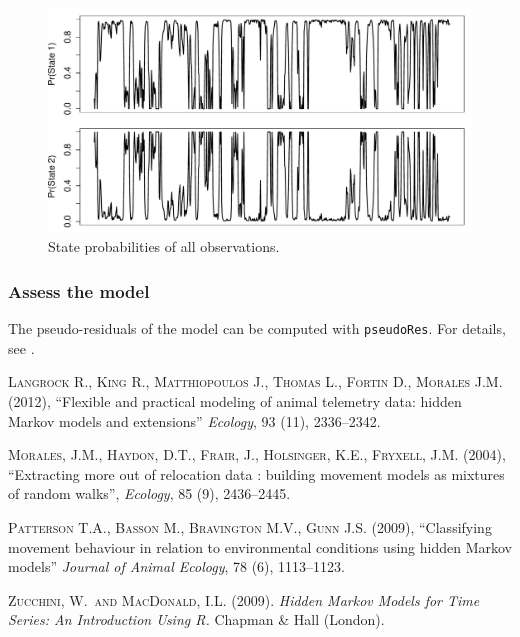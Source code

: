 \documentclass[]{article}
\begin{document}
\begin{figure}[h]
	\centering
	\includegraphics[width=\textwidth]{pictures/stateProbs}
	\caption{State probabilities of all observations.}
	\label{stateProbs}
\end{figure}

\subsubsection{Assess the model}
The pseudo-residuals of the model can be computed with \texttt{pseudoRes}. For details, see \cite{zucchini2009}.


\begin{thebibliography}{}

\textsc{Langrock R., King R., Matthiopoulos J., Thomas L., Fortin D., Morales J.M.} (2012),
``Flexible and practical modeling of animal telemetry data: hidden Markov models and extensions''
\textit{Ecology}, 93 (11), 2336--2342.

\textsc{Morales, J.M., Haydon, D.T., Frair, J., Holsinger, K.E., Fryxell, J.M.} (2004),
``Extracting more out of relocation data : building movement models as mixtures of random walks'',
\textit{Ecology}, 85 (9), 2436--2445.

\textsc{Patterson T.A., Basson M., Bravington M.V., Gunn J.S.} (2009),
``Classifying movement behaviour in relation to environmental conditions using hidden Markov models''
\textit{Journal of Animal Ecology}, 78 (6), 1113--1123.

\textsc{Zucchini, W.\ and MacDonald, I.L.} (2009).
{\em Hidden Markov Models for Time Series: An Introduction Using R.}
Chapman \& Hall (London).

\end{thebibliography}
\end{document}
